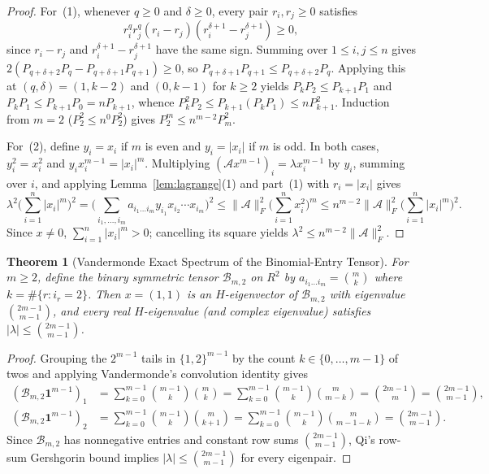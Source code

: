 \documentclass[11pt]{article}
\newtheorem{theorem}{Theorem}[section]
\theoremstyle{definition}
\newcommand{\cA}{\mathcal{A}}
\newcommand{\cB}{\mathcal{B}}
\begin{document}
\begin{proof}
For~(1), whenever $q \ge 0$ and $\delta \ge 0$, every pair $r_i, r_j \ge 0$ satisfies
\[
  r_i^q r_j^q (r_i - r_j)(r_i^{\delta + 1} - r_j^{\delta + 1}) \ge 0,
\]
since $r_i - r_j$ and $r_i^{\delta+1} - r_j^{\delta+1}$ have the same sign. Summing over
$1 \le i, j \le n$ gives $2(P_{q+\delta+2} P_q - P_{q+\delta+1} P_{q+1}) \ge 0$, so
$P_{q+\delta+1} P_{q+1} \le P_{q+\delta+2} P_q$. Applying this at $(q, \delta) = (1, k-2)$ and
$(0, k-1)$ for $k \ge 2$ yields $P_k P_2 \le P_{k+1} P_1$ and $P_k P_1 \le P_{k+1} P_0 = n P_{k+1}$,
whence $P_k^2 P_2 \le P_{k+1} (P_k P_1) \le n P_{k+1}^2$. Induction from $m = 2$ ($P_2^2 \le n^0 P_2^2$)
gives $P_2^m \le n^{m-2} P_m^2$.

For~(2), define $y_i = x_i$ if $m$ is even and $y_i = |x_i|$ if $m$ is odd. In both cases,
$y_i^2 = x_i^2$ and $y_i x_i^{m-1} = |x_i|^m$. Multiplying $(\cA x^{m-1})_i = \lambda x_i^{m-1}$
by $y_i$, summing over $i$, and applying Lemma~\ref{lem:lagrange}(1) and part~(1) with $r_i = |x_i|$ gives
\[
  \lambda^2 \biggl(\sum_{i=1}^n |x_i|^m\biggr)^2
  = \biggl(\sum_{i_1, \dots, i_m} a_{i_1 \dots i_m} y_{i_1} x_{i_2} \cdots x_{i_m}\biggr)^2
  \le \|\cA\|_F^2 \biggl(\sum_{i=1}^n x_i^2\biggr)^m
  \le n^{m-2} \|\cA\|_F^2 \biggl(\sum_{i=1}^n |x_i|^m\biggr)^2.
\]
Since $x \ne 0$, $\sum_{i=1}^n |x_i|^m > 0$; cancelling its square yields $\lambda^2 \le n^{m-2}\|\cA\|_F^2$.
\end{proof}

\begin{theorem}[Vandermonde Exact Spectrum of the Binomial-Entry Tensor]\label{thm:vandermonde}
For $m \ge 2$, define the binary symmetric tensor $\cB_{m,2}$ on $R^2$ by
$a_{i_1 \dots i_m} = \binom{m}{k}$ where $k = \#\{r : i_r = 2\}$. Then $x = (1, 1)$ is an
$H$-eigenvector of $\cB_{m,2}$ with eigenvalue $\binom{2m-1}{m-1}$, and every real
$H$-eigenvalue (and complex eigenvalue) satisfies $|\lambda| \le \binom{2m-1}{m-1}$.
\end{theorem}

\begin{proof}
Grouping the $2^{m-1}$ tails in $\{1, 2\}^{m-1}$ by the count $k \in \{0, \dots, m-1\}$ of twos
and applying Vandermonde's convolution identity gives
\begin{align*}
  (\cB_{m,2} \mathbf{1}^{m-1})_1 &= \sum_{k=0}^{m-1} \binom{m-1}{k}\binom{m}{k}
    = \sum_{k=0}^{m-1} \binom{m-1}{k}\binom{m}{m-k} = \binom{2m-1}{m} = \binom{2m-1}{m-1}, \\
  (\cB_{m,2} \mathbf{1}^{m-1})_2 &= \sum_{k=0}^{m-1} \binom{m-1}{k}\binom{m}{k+1}
    = \sum_{k=0}^{m-1} \binom{m-1}{k}\binom{m}{m-1-k} = \binom{2m-1}{m-1}.
\end{align*}
Since $\cB_{m,2}$ has nonnegative entries and constant row sums $\binom{2m-1}{m-1}$, Qi's
row-sum Gershgorin bound implies $|\lambda| \le \binom{2m-1}{m-1}$ for every eigenpair.
\end{proof}
\end{document}
